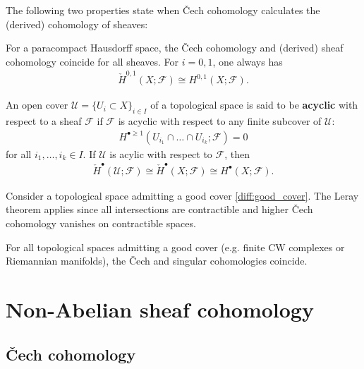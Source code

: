     The following two properties state when \v{C}ech cohomology calculates the (derived) cohomology of sheaves:
    \begin{property}
        For a paracompact Hausdorff space, the \v{C}ech cohomology and (derived) sheaf cohomology coincide for all sheaves. For $i=0,1$, one always has
        \begin{gather}
            \check{H}^{0,1}(X;\mathcal{F})\cong H^{0,1}(X;\mathcal{F}).
        \end{gather}
    \end{property}
    \begin{property}[Leray]
        An open cover $\mathcal{U}=\{U_i\subset X\}_{i\in I}$ of a topological space is said to be \textbf{acyclic} with respect to a sheaf $\mathcal{F}$ if $\mathcal{F}$ is acyclic with respect to any finite subcover of $\mathcal{U}$:
        \begin{gather}
            H^{\bullet\geq1}(U_{i_1}\cap\ldots\cap U_{i_k};\mathcal{F})=0
        \end{gather}
        for all $i_1,\ldots,i_k\in I$. If $\mathcal{U}$ is acylic with respect to $\mathcal{F}$, then
        \begin{gather}
            \check{H}^\bullet(\mathcal{U};\mathcal{F})\cong\check{H}^\bullet(X;\mathcal{F})\cong H^\bullet(X;\mathcal{F}).
        \end{gather}
    \end{property}
    \begin{example}
        Consider a topological space admitting a good cover \ref{diff:good_cover}. The Leray theorem applies since all intersections are contractible and higher \v{C}ech cohomology vanishes on contractible spaces.
    \end{example}
    \begin{result}
        For all topological spaces admitting a good cover (e.g. finite CW complexes or Riemannian manifolds), the \v{C}ech and singular cohomologies coincide.
    \end{result}

\section{Non-Abelian sheaf cohomology}
\subsection{\v{C}ech cohomology}

